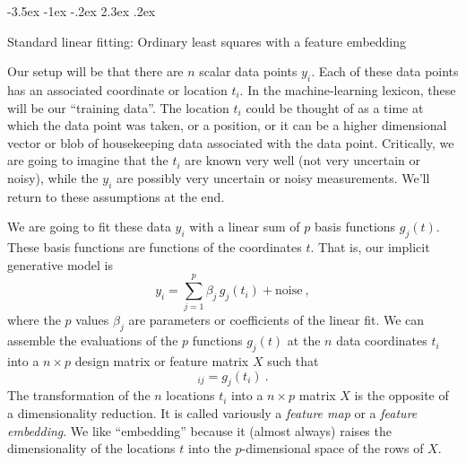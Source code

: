 \documentclass[12pt,letterpaper]{article}
\makeatletter
\renewcommand\section{\@startsection {section}{1}{\z@}%
  {-3.5ex \@plus -1ex \@minus -.2ex}%
  {2.3ex \@plus.2ex}%
  {\raggedright\normalfont\Large\bfseries}}
\makeatother
\begin{document}
\section{Standard linear fitting: Ordinary least squares with a feature embedding}\label{sec:ols}

Our setup will be that there are $n$ scalar data points $y_i$.
Each of these data points has an associated coordinate or location $t_i$.
In the machine-learning lexicon, these will be our ``training data''.
The location $t_i$ could be thought of as a time at which the data point was taken, or a position, or it can be a higher dimensional vector or blob of housekeeping data associated with the data point.
Critically, we are going to imagine that the $t_i$ are known very well (not very uncertain or noisy), while the $y_i$ are possibly very uncertain or noisy measurements.
We'll return to these assumptions at the end.

We are going to fit these data $y_i$ with a linear sum of $p$ basis functions $g_j(t)$. These basis functions are functions of the coordinates $t$. That is, our implicit generative model is
\begin{equation}
    y_i = \sum_{j=1}^p \beta_j\,g_j(t_i) + \mathrm{noise}
    ~,
\label{eq.model}
\end{equation}
where the $p$ values $\beta_j$ are parameters or coefficients of the linear fit. We can assemble the evaluations of the $p$ functions $g_j(t)$ at the $n$ data coordinates $t_i$ into a $n\times p$ design matrix or feature matrix $X$ such that
\begin{equation}
    [X]_{ij} = g_j(t_i)
    ~.
\end{equation}
The transformation of the $n$ locations $t_i$ into a $n\times p$ matrix $X$ is the opposite of a dimensionality reduction.
It is called variously a \emph{feature map} or a \emph{feature embedding}.
We like ``embedding'' because it (almost always) raises the dimensionality of the locations $t$ into the $p$-dimensional space of the rows of $X$.
\end{document}
